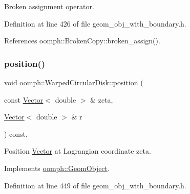Broken assignment operator. 



Definition at line 426 of file geom\+\_\+obj\+\_\+with\+\_\+boundary.\+h.



References oomph\+::\+Broken\+Copy\+::broken\+\_\+assign().

\mbox{\label{classoomph_1_1WarpedCircularDisk_a270669e4e5424db18ad657f3876ed6bb}} 
\subsubsection{\texorpdfstring{position()}{position()}\hspace{0.1cm}{\footnotesize\ttfamily [1/2]}}
{\footnotesize\ttfamily void oomph\+::\+Warped\+Circular\+Disk\+::position (\begin{DoxyParamCaption}\item[{const \hyperlink{classoomph_1_1Vector}{Vector}$<$ double $>$ \&}]{zeta,  }\item[{\hyperlink{classoomph_1_1Vector}{Vector}$<$ double $>$ \&}]{r }\end{DoxyParamCaption}) const\hspace{0.3cm}{\ttfamily [inline]}, {\ttfamily [virtual]}}



Position \hyperlink{classoomph_1_1Vector}{Vector} at Lagrangian coordinate zeta. 



Implements \hyperlink{classoomph_1_1GeomObject_a0d04c9d4667817f3ef24bb660fd56065}{oomph\+::\+Geom\+Object}.



Definition at line 449 of file geom\+\_\+obj\+\_\+with\+\_\+boundary.\+h.

\mbox{\label{classoomph_1_1WarpedCircularDisk_afcc9e5e2c88d05b61006bd432e3aa31b}} 

